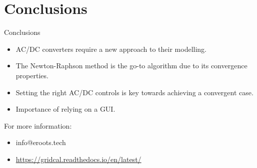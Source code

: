 \section{Conclusions}

\begin{frame}{}
    \tableofcontents[currentsection]
\end{frame}

\begin{frame}{Conclusions}
    \begin{itemize}
        \item AC/DC converters require a new approach to their modelling.
        \item The Newton-Raphson method is the go-to algorithm due to its convergence properties.
        \item Setting the right AC/DC controls is key towards achieving a convergent case.
        \item Importance of relying on a GUI.
    \end{itemize}
    For more information:

    \begin{itemize}
        \item info@eroots.tech
        \item \href{https://gridcal.readthedocs.io/en/latest/}{https://gridcal.readthedocs.io/en/latest/}
    \end{itemize}
    
\end{frame}
